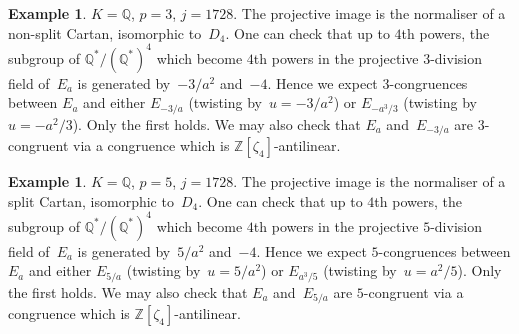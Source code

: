 \documentclass[12pt, reqno]{amsart}
\newcommand{\Q}{\mathbb{Q}}
\newcommand{\Z}{\mathbb{Z}}
\newcommand{\rhobar}{{\overline{\rho}}}
\numberwithin{equation}{section}
\theoremstyle{definition}
\newtheorem{example}[theorem]{Example}
\theoremstyle{remark}
\begin{document}



\begin{example}
$K=\Q$, $p=3$, $j=1728$.  The projective image is the normaliser of a
  non-split Cartan, isomorphic to~$D_4$.  One can check that up to
  $4$th powers, the subgroup of $\Q^*/(\Q^*)^4$ which become $4$th
  powers in the projective $3$-division field of~$E_a$ is generated
  by~$-3/a^2$ and~$-4$.  Hence we expect $3$-congruences between $E_a$
  and either $E_{-3/a}$ (twisting by~$u=-3/a^2$) or $E_{-a^3/3}$
  (twisting by~$u=-a^2/3$).  Only the first holds.  We may also check
  that $E_a$ and~$E_{-3/a}$ are $3$-congruent via a congruence which
  is $\Z[\zeta_4]$-antilinear.
\end{example}

\begin{example}
$K=\Q$, $p=5$, $j=1728$.  The projective image is the normaliser of a
  split Cartan, isomorphic to~$D_4$.  One can check that up to $4$th
  powers, the subgroup of $\Q^*/(\Q^*)^4$ which become $4$th powers in
  the projective $5$-division field of~$E_a$ is generated by~$5/a^2$
  and~$-4$.  Hence we expect $5$-congruences between $E_a$ and either
  $E_{5/a}$ (twisting by~$u=5/a^2$) or $E_{a^3/5}$ (twisting
  by~$u=a^2/5$).  Only the first holds.  We may also check that $E_a$
  and~$E_{5/a}$ are $5$-congruent via a congruence which is
  $\Z[\zeta_4]$-antilinear.
\end{example}
\end{document}
